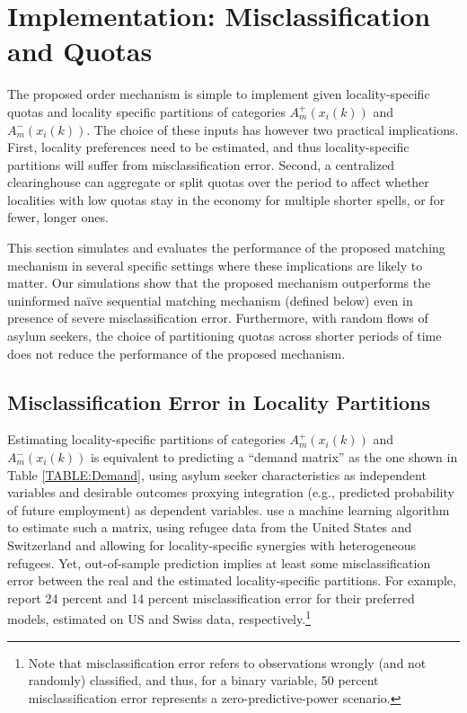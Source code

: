 \documentclass[12pt,fleqn]{article}
\begin{document}
\section{Implementation: Misclassification and Quotas}\label{SEC:simulations}
The proposed order mechanism is simple to implement given locality-specific quotas and locality specific partitions of categories $A^+_m(x_i(k))$ and $A^-_m(x_i(k))$. The choice of these inputs has however two practical implications. First, locality preferences need to be estimated, and thus locality-specific partitions will suffer from misclassification error. Second, a centralized clearinghouse can aggregate or split quotas over the period to affect whether localities with low quotas stay in the economy for multiple shorter spells, or for fewer, longer ones.

This section simulates and evaluates the performance of the proposed matching mechanism in several specific settings where these implications are likely to matter. Our simulations show that the proposed mechanism outperforms the uninformed na\"{i}ve sequential matching mechanism (defined below) even in presence of severe misclassification error. Furthermore, with random flows of asylum seekers, the choice of partitioning quotas across shorter periods of time does not reduce the performance of the proposed mechanism.

\subsection{Misclassification Error in Locality Partitions}
Estimating locality-specific partitions of categories $A^+_m(x_i(k))$ and $A^-_m(x_i(k))$ is equivalent to predicting a ``demand matrix'' as the one shown in Table \ref{TABLE:Demand}, using asylum seeker characteristics as independent variables and desirable outcomes proxying integration (e.g., predicted probability of future employment) as dependent variables. \cite{bib:BansakEtAl} use a machine learning algorithm to estimate such a matrix, using refugee data from the United States and Switzerland and allowing for locality-specific synergies with heterogeneous refugees. Yet, out-of-sample prediction implies at least some misclassification error between the real and the estimated locality-specific partitions. For example, \cite{bib:BansakEtAl} report 24 percent and 14 percent misclassification error for their preferred models, estimated on US and Swiss data, respectively.\footnote{Note that misclassification error refers to observations wrongly (and not randomly) classified, and thus, for a binary variable, 50 percent misclassification error represents a zero-predictive-power scenario.}
\end{document}
